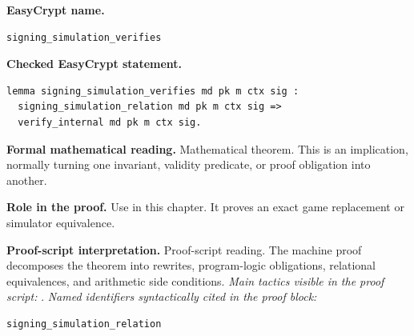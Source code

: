 \begin{formaltheorem}
\noindent\textbf{EasyCrypt name.}
\begin{lstlisting}[language=EasyCrypt,basicstyle=\ttfamily\scriptsize]
signing_simulation_verifies
\end{lstlisting}
\noindent\textbf{Checked EasyCrypt statement.}
\begin{lstlisting}[language=EasyCrypt,basicstyle=\ttfamily\scriptsize]
lemma signing_simulation_verifies md pk m ctx sig :
  signing_simulation_relation md pk m ctx sig =>
  verify_internal md pk m ctx sig.
\end{lstlisting}
\noindent\textbf{Formal mathematical reading.}
Mathematical theorem. This is an implication, normally turning one invariant, validity predicate, or proof obligation into another.

\noindent\textbf{Role in the proof.}
Use in this chapter. It proves an exact game replacement or simulator equivalence.

\noindent\textbf{Proof-script interpretation.}
Proof-script reading. The machine proof decomposes the theorem into rewrites, program-logic obligations, relational equivalences, and arithmetic side conditions.
\emph{Main tactics visible in the proof script:} .
\emph{Named identifiers syntactically cited in the proof block:}
\begin{lstlisting}[language=EasyCrypt,basicstyle=\ttfamily\scriptsize]
signing_simulation_relation
\end{lstlisting}

\end{formaltheorem}

